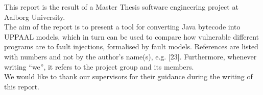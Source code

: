 This report is the result of a Master Thesis software engineering project at Aalborg University.\\

\noindent The aim of the report is to present a tool for converting Java bytecode into UPPAAL models, which in turn can be used to compare how vulnerable different programs are to fault injections, formalised by fault models. References are listed with numbers and not by the author’s name(s), e.g. [23]. Furthermore, whenever writing “we”, it refers to the project group and its members.\\

\noindent We would like to thank our supervisors for their guidance during the writing of this
report.

\afterpage{\null\newpage}
